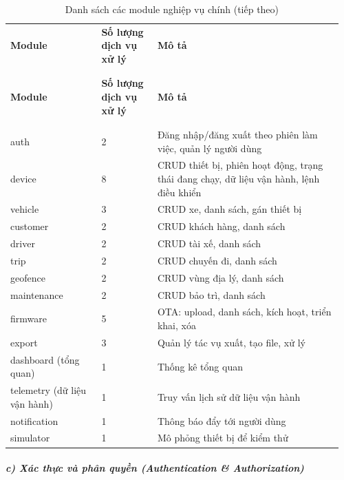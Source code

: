 \documentclass[a4paper]{extarticle}
\newcommand{\thesissettableid}[2]{%
  \renewcommand{\thetable}{#1}%
  \renewcommand{\theHtable}{#2}%
}
\begin{document}
{\thesissettableid{4.7}{tab-ch4-danh-sach-cac-domain-modules-chinh}
\def\LTcaptype{table}
\begin{longtable}{|L{0.263\linewidth}|L{0.162\linewidth}|L{0.539\linewidth}|}
\caption{Danh sách các module nghiệp vụ chính}\label{tab:ch4-danh-sach-cac-domain-modules-chinh}\\
\hline \textbf{Module} & \textbf{Số lượng dịch vụ xử lý} & \textbf{Mô tả} \\
\\\hline
\endfirsthead
\caption[]{Danh sách các module nghiệp vụ chính (tiếp theo)}\\
\hline \textbf{Module} & \textbf{Số lượng dịch vụ xử lý} & \textbf{Mô tả} \\
\\\hline
\endhead
\\\hline
\endfoot
\endlastfoot
auth & 2 & Đăng nhập/đăng xuất theo phiên làm việc, quản lý người dùng \\\hline
device & 8 & CRUD thiết bị, phiên hoạt động, trạng thái đang chạy, dữ liệu vận hành, lệnh
điều khiển \\\hline
vehicle & 3 & CRUD xe, danh sách, gán thiết bị \\\hline
customer & 2 & CRUD khách hàng, danh sách \\\hline
driver & 2 & CRUD tài xế, danh sách \\\hline
trip & 2 & CRUD chuyến đi, danh sách \\\hline
geofence & 2 & CRUD vùng địa lý, danh sách \\\hline
maintenance & 2 & CRUD bảo trì, danh sách \\\hline
firmware & 5 & OTA: upload, danh sách, kích hoạt, triển khai, xóa \\\hline
export & 3 & Quản lý tác vụ xuất, tạo file, xử lý \\\hline
dashboard (tổng quan) & 1 & Thống kê tổng quan \\\hline
telemetry (dữ liệu vận hành) & 1 & Truy vấn lịch sử dữ liệu vận hành \\\hline
notification & 1 & Thông báo đẩy tới người dùng \\\hline
simulator & 1 & Mô phỏng thiết bị để kiểm thử \\\hline
\end{longtable}
}


\subparagraph{c) Xác thực và phân quyền (Authentication \&
Authorization)}\label{c-xuxe1c-thux1ef1c-vuxe0-phuxe2n-quyux1ec1n-authentication--authorization}
\end{document}
